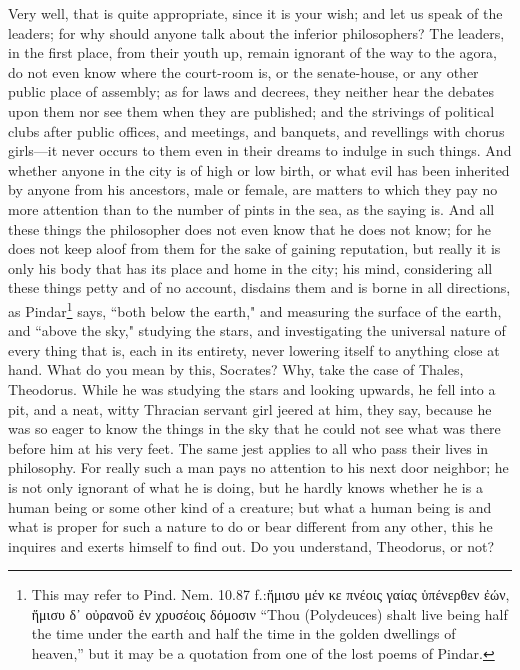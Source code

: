 \documentclass[letterpaper,12pt]{article}
\newcommand{\textgreek}[1]{\begingroup\fontencoding{LGR}\selectfont#1\endgroup}
\newcommand{\stephpag}[1]{\marginnote{\small\itshape\fontfamily{ppl}\selectfont #1}}
\begin{document}
\begin{drama}
\socratesspeaks
Very well, that is quite appropriate, since it is your wish; and let us speak of the leaders; for why should anyone talk about the inferior philosophers? The leaders, in the first place, from their youth up, remain ignorant of the way to the agora, \stephpag{d} do not even know where the court-room is, or the senate-house, or any other public place of assembly; as for laws and decrees, they neither hear the debates upon them nor see them when they are published; and the strivings of political clubs after public offices, and meetings, and banquets, and revellings with chorus girls—it never occurs to them even in their dreams to indulge in such things. And whether anyone in the city is of high or low birth, or what evil has been inherited by anyone from his ancestors, male or female, are matters to which they pay no more attention than to the number of pints in the sea, as the saying is. \stephpag{e} And all these things the philosopher does not even know that he does not know; for he does not keep aloof from them for the sake of gaining reputation, but really it is only his body that has its place and home in the city; his mind, considering all these things petty and of no account, disdains them and is borne in all directions, as Pindar\footnote{This may refer to Pind. Nem. 10.87 f.:\textgreek{ἥμισυ μέν κε πνέοις γαίας ὑπένερθεν ἐών, ἥμισυ δ᾽ οὐρανοῦ ἐν χρυσέοις δόμοσιν} ``Thou (Polydeuces) shalt live being half the time under the earth and half the time in the golden dwellings of heaven,'' but it may be a quotation from one of the lost poems of Pindar.} says, ``both below the earth," and measuring the surface of the earth, and ``above the sky," studying the stars, and investigating the universal nature \stephpag{174 a} of every thing that is, each in its entirety, never lowering itself to anything close at hand.
\theodorusspeaks
What do you mean by this, Socrates?
\socratesspeaks
Why, take the case of Thales, Theodorus. While he was studying the stars and looking upwards, he fell into a pit, and a neat, witty Thracian servant girl jeered at him, they say, because he was so eager to know the things in the sky that he could not see what was there before him at his very feet. The same jest applies to all who pass their lives in philosophy. \stephpag{b} For really such a man pays no attention to his next door neighbor; he is not only ignorant of what he is doing, but he hardly knows whether he is a human being or some other kind of a creature; but what a human being is and what is proper for such a nature to do or bear different from any other, this he inquires and exerts himself to find out. Do you understand, Theodorus, or not?

\end{drama}
\end{document}
